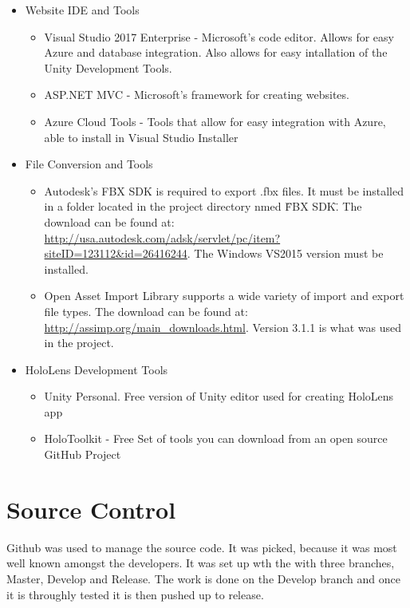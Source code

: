 \begin{itemize}

    \item Website IDE and Tools
    \begin{itemize}
        \item Visual Studio 2017 Enterprise - Microsoft's code editor. Allows for easy Azure and database
        integration. Also allows for easy intallation of the Unity Development Tools.
        \item ASP.NET MVC - Microsoft's framework for creating websites.
        \item Azure Cloud Tools - Tools that allow for easy integration with Azure, able to install in Visual Studio Installer
    \end{itemize}

    \item File Conversion and Tools
    \begin{itemize}
        \item Autodesk's FBX SDK is required to export .fbx files.  It must be installed in a folder located in the project directory nmed \"FBX SDK\".  The download can be found at: 
        \url{http://usa.autodesk.com/adsk/servlet/pc/item?siteID=123112&id=26416244}.
        The Windows VS2015 version must be installed.

        \item Open Asset Import Library supports a wide variety of import and export file types.  The download can be found at: \url{http://assimp.org/main_downloads.html}.  Version 3.1.1 is what was used in the project.         
    \end{itemize}

    \item HoloLens Development Tools
    \begin{itemize}
        \item Unity Personal. Free version of Unity editor used for creating HoloLens app

        \item HoloToolkit - Free Set of tools you can download from an open source GitHub Project

    \end{itemize}
\end{itemize}


\section{Source  Control}
Github was used to manage the source code. It was picked, because it was most well known amongst the
developers. It was set up wth the with three branches, Master, Develop and Release. The work is done on the Develop branch
and once it is throughly tested it is then pushed up to release.

